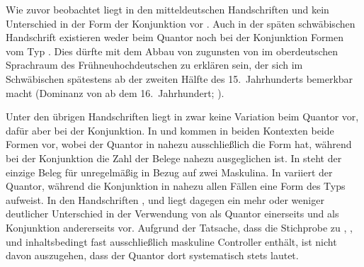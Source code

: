 Wie zuvor beobachtet liegt in den mitteldeutschen Handschriften \citet{kc:H}
und \citet{kc:P} kein Unterschied in der Form der Konjunktion vor
\autocite[vgl.][181]{ksw2}. Auch in der späten schwäbischen
Handschrift \citet{kc:Z} existieren weder beim Quantor noch bei der Konjunktion
Formen vom Typ . Dies dürfte mit dem Abbau von 
zugunsten von  im oberdeutschen Sprachraum des Frühneuhochdeutschen zu
erklären sein, der sich im Schwäbischen spätestens ab der zweiten Hälfte des
15.~Jahrhunderts bemerkbar macht (Dominanz von  ab dem 16.~Jahrhundert;
\cites[vgl.][210]{moserstopp1978}[120]{solmswegera1991}).

Unter den übrigen Handschriften liegt in \citet{kc:A1} zwar keine Variation
beim Quantor vor, dafür aber bei der Konjunktion. In \citet{kc:VB} und
\citet{kc:B1} kommen in beiden Kontexten beide Formen vor, wobei der Quantor in
\citet{kc:VB} nahezu ausschließlich die Form  hat, während bei der
Konjunktion die Zahl der Belege nahezu ausgeglichen ist. In \citet{kc:K} steht
der einzige Beleg für  unregelmäßig in Bezug auf zwei Maskulina.
In \citet{kc:B1} variiert der Quantor, während die Konjunktion in nahezu allen
Fällen eine Form des Typs  aufweist. In den Handschriften
\citet{kc:C1}, \citet{kc:M} und \citet{kc:K} liegt dagegen ein mehr oder
weniger deutlicher Unterschied in der Verwendung von  als Quantor
einerseits und  als Konjunktion andererseits vor. Aufgrund der
Tatsache, dass die Stichprobe zu \citet{kc:A1}, \citet{kc:VB}, \citet{kc:M} und
\citet{kc:K} inhaltsbedingt fast ausschließlich maskuline Controller enthält,
ist nicht davon auszugehen, dass der Quantor dort systematisch stets
 lautet.


